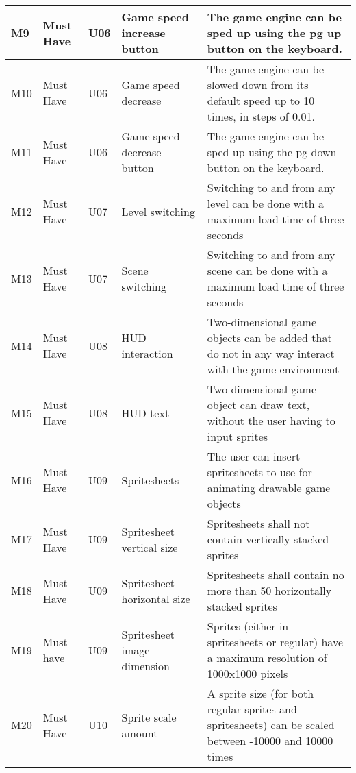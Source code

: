 \documentclass{article} %
\begin{document}
\begin{longtable}{|p{}|p{}|p{}|p{}|p{}|}
    M9                          & Must Have                          & U06                & Game speed increase button        & The game engine can be sped up using the pg up button on the keyboard.                                                                                      \\ \hline
    M10                         & Must Have                          & U06                & Game speed decrease               & The game engine can be slowed down from its default speed up to 10 times, in steps of 0.01.                                                                 \\ \hline
    M11                         & Must Have                          & U06                & Game speed decrease button        & The game engine can be sped up using the pg down button on the keyboard.                                                                                    \\ \hline
    M12                         & Must Have                          & U07                & Level switching & Switching to and from any level can be done with a maximum load time of three seconds \\ \hline
    M13 & Must Have & U07 &                                                                                         Scene switching & Switching to and from any scene can be done with a maximum load time of three seconds \\ \hline
    M14 & Must Have & U08 & HUD interaction & Two-dimensional game objects can be added that do not in any way interact with the game environment \\ \hline
    M15 & Must Have & U08 & HUD text & Two-dimensional game object can draw text, without the user having to input sprites \\ \hline
    M16 & Must Have & U09 & Spritesheets & The user can insert spritesheets to use for animating drawable game objects \\ \hline
    M17 & Must Have & U09 & Spritesheet vertical size & Spritesheets shall not contain vertically stacked sprites \\ \hline
    M18 & Must Have & U09 & Spritesheet horizontal size & Spritesheets shall contain no more than 50 horizontally stacked sprites \\ \hline
    M19 & Must have & U09 & Spritesheet image dimension & Sprites (either in spritesheets or regular) have a maximum resolution of 1000x1000 pixels \\ \hline
    M20 & Must Have & U10 & Sprite scale amount & A sprite size (for both regular sprites and spritesheets) can be scaled between -10000 and 10000 times \\ \hline

\end{longtable}
\end{document}
